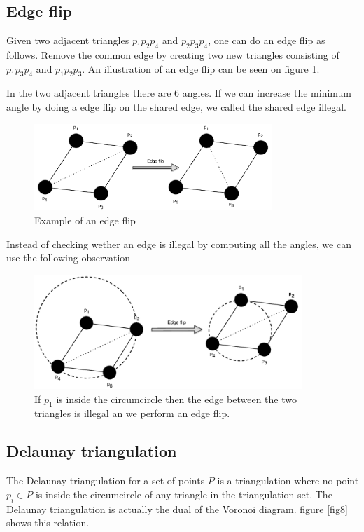 \documentclass[10pt]{article}
\begin{document}



\subsection{Edge flip} %
\label{sub:edge_flip}
Given two adjacent triangles $p_1 p_2 p_4$ and $p_2 p_3 p_4$, one can do an edge flip as follows. Remove the common edge by creating two new triangles consisting of $p_1 p_3 p_4$ and $p_1 p_2 p_3$. An illustration of an edge flip can be seen on figure \ref{fig6}.

In the two adjacent triangles there are 6 angles. If we can increase the minimum angle by doing a edge flip on the shared edge, we called the shared edge illegal.

\begin{figure}[ht]
\centering
\includegraphics[width=0.8\textwidth]{figures/fig6.pdf}
\caption{Example of an edge flip}
\label{fig6}
\end{figure}

Instead of checking wether an edge is illegal by computing all the angles, we can use the following observation

\begin{figure}[ht]
\centering
\includegraphics[width=0.9\textwidth]{figures/fig7.pdf}
\caption{If $p_1$ is inside the circumcircle then the edge between the two triangles is illegal an we perform an edge flip.}
\label{fig7}
\end{figure}


\subsection{Delaunay triangulation} %
\label{sub:delaunay_triangulation}
The Delaunay triangulation for a set of points $P$ is a triangulation where no point $p_i \in P$ is inside the circumcircle of any triangle in the triangulation set. The Delaunay triangulation is actually the dual of the Voronoi diagram. figure \ref{fig8} shows this relation. 
\end{document}
